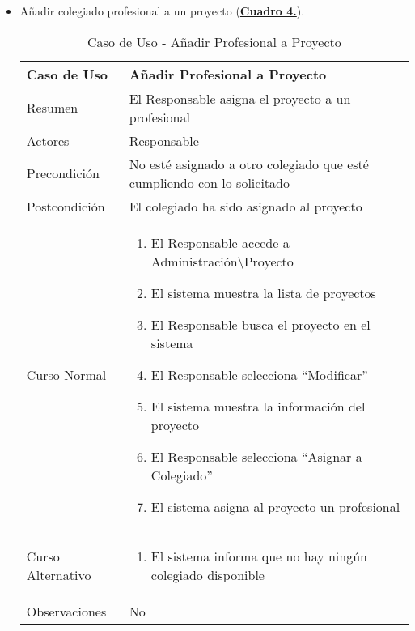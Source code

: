 \begin{itemize}
  \pagebreak
	\item \addtocounter{tabla}{1} Añadir colegiado profesional a un proyecto (\textbf{\hyperref[tab:curAsignarProfProyecto]{Cuadro 4.}}). 
		\begin{table}[!htbp]
		  \centering  \addtocounter{casouso}{1}
		  \begin{tabular}{|l | p{100mm}|}
		    \textbf{Caso de Uso}  & \textbf{Añadir Profesional a Proyecto} \\ \hline
		    Resumen 		 & El Responsable asigna el proyecto a un profesional \\ \hline
		    Actores  		 & Responsable \\ \hline
		    Precondición  	 & No esté asignado a otro colegiado que esté cumpliendo con lo solicitado  \\ \hline
		    Postcondición  	 & El colegiado ha sido asignado al proyecto \\ \hline
		    Curso Normal   	 & \begin{enumerate}
		    \item El Responsable accede a Administración\textbackslash Proyecto
			  \item El sistema muestra la lista de proyectos
			  \item El Responsable busca el proyecto en el sistema
			  \item El Responsable selecciona ``Modificar''
			  \item El sistema muestra la información del proyecto
			  \item El Responsable selecciona ``Asignar a Colegiado''
			  \item El sistema asigna al proyecto un profesional
		    \end{enumerate}  \\ \hline
		    Curso Alternativo  & \begin{enumerate}
			  \item El sistema informa que no hay ningún colegiado disponible
		    \end{enumerate}  \\ \hline
		    Observaciones 	 & No  \\ \hline
		  \end{tabular}
		  \caption{Caso de Uso  - Añadir Profesional a Proyecto}
		  \label{tab:curAsignarProfProyecto}
		\end{table}
		\FloatBarrier
		

\end{itemize}
